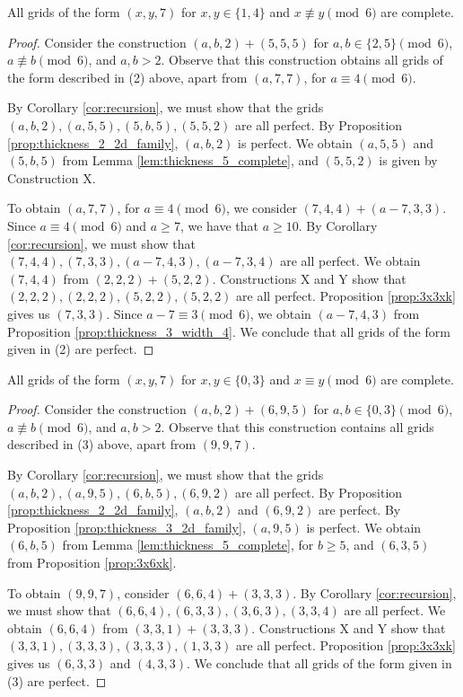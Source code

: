 \begin{lem}
\label{lem:thickness_7_case_2}
All grids of the form $(x,y,7)$ for $x,y \in \{1,4\}$ and $x \not\equiv y \pmod 6$ are complete.
\end{lem}

\begin{proof}
Consider the construction $(a,b,2) + (5,5,5)$ for $a,b \in \{2,5\} \pmod 6$, $a \not\equiv b \pmod 6$, and $a,b > 2$. Observe that this construction obtains all grids of the form described in (2) above, apart from $(a,7,7)$, for $a \equiv 4 \pmod 6$. 

By Corollary \ref{cor:recursion}, we must show that the grids $(a,b,2), (a,5,5), (5,b,5), (5,5,2)$ are all perfect. By Proposition \ref{prop:thickness_2_2d_family}, $(a,b,2)$ is perfect. We obtain $(a,5,5)$ and $(5,b,5)$ from Lemma \ref{lem:thickness_5_complete}, and $(5,5,2)$ is given by Construction X.

To obtain $(a,7,7)$, for $a \equiv 4 \pmod 6$, we consider $(7,4,4) + (a-7,3,3)$. Since $a \equiv 4 \pmod 6$ and $a \geq 7$, we have that $a \geq 10$. By Corollary \ref{cor:recursion}, we must show that $(7,4,4), (7,3,3), (a-7,4,3), (a-7,3,4)$ are all perfect. We obtain $(7,4,4)$ from $(2,2,2) + (5,2,2)$. Constructions X and Y show that $(2,2,2), (2,2,2), (5,2,2), (5,2,2)$ are all perfect. Proposition \ref{prop:3x3xk} gives us $(7,3,3)$. Since $a-7 \equiv 3 \pmod 6$, we obtain $(a-7,4,3)$ from Proposition \ref{prop:thickness_3_width_4}. We conclude that all grids of the form given in (2) are perfect. 
\end{proof}

\begin{lem}
\label{lem:thickness_7_case_3}
All grids of the form $(x,y,7)$ for $x,y \in \{0,3\}$ and $x \equiv y \pmod 6$ are complete.
\end{lem}

\begin{proof}
Consider the construction $(a,b,2) + (6,9,5)$ for $a,b \in \{0,3\} \pmod 6$, $a \not\equiv b \pmod 6$, and $a,b > 2$. Observe that this construction contains all grids described in (3) above, apart from $(9,9,7)$. 

By Corollary \ref{cor:recursion}, we must show that the grids $(a,b,2), (a,9,5), (6,b,5), (6,9,2)$ are all perfect. By Proposition \ref{prop:thickness_2_2d_family}, $(a,b,2)$ and $(6,9,2)$ are perfect. By Proposition \ref{prop:thickness_3_2d_family}, $(a,9,5)$ is perfect. We obtain $(6,b,5)$ from Lemma \ref{lem:thickness_5_complete}, for $b \geq 5$, and $(6,3,5)$ from Proposition \ref{prop:3x6xk}. 

To obtain $(9,9,7)$, consider $(6,6,4) + (3,3,3)$. By Corollary \ref{cor:recursion}, we must show that $(6,6,4), (6,3,3), (3,6,3), (3,3,4)$ are all perfect. We obtain $(6,6,4)$ from $(3,3,1) + (3,3,3)$. Constructions X and Y show that $(3,3,1), (3,3,3), (3,3,3), (1,3,3)$ are all perfect. Proposition \ref{prop:3x3xk} gives us $(6,3,3)$ and $(4,3,3)$. We conclude that all grids of the form given in (3) are perfect.
\end{proof}

